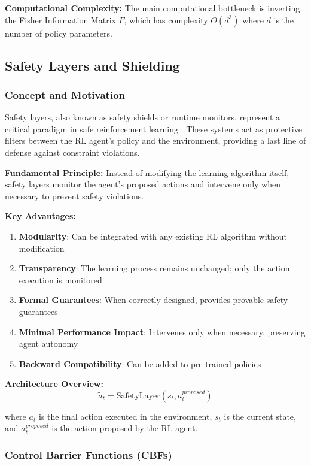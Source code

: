 \documentclass[12pt]{article}
\begin{document}
{{{{\textbf{Computational Complexity:} The main computational bottleneck is inverting the Fisher Information Matrix $F$, which has complexity $O(d^3)$ where $d$ is the number of policy parameters.

\subsection{Safety Layers and Shielding}

\subsubsection{Concept and Motivation}

Safety layers, also known as safety shields or runtime monitors, represent a critical paradigm in safe reinforcement learning \cite{Alshiekh2018}. These systems act as protective filters between the RL agent's policy and the environment, providing a last line of defense against constraint violations.

\textbf{Fundamental Principle:} Instead of modifying the learning algorithm itself, safety layers monitor the agent's proposed actions and intervene only when necessary to prevent safety violations.

\textbf{Key Advantages:}
\begin{enumerate}
\item \textbf{Modularity}: Can be integrated with any existing RL algorithm without modification
\item \textbf{Transparency}: The learning process remains unchanged; only the action execution is monitored
\item \textbf{Formal Guarantees}: When correctly designed, provides provable safety guarantees
\item \textbf{Minimal Performance Impact}: Intervenes only when necessary, preserving agent autonomy
\item \textbf{Backward Compatibility}: Can be added to pre-trained policies
\end{enumerate}

\textbf{Architecture Overview:}
\begin{equation}
\tilde{a}_t = \text{SafetyLayer}(s_t, a_t^{proposed})
\end{equation}

where $\tilde{a}_t$ is the final action executed in the environment, $s_t$ is the current state, and $a_t^{proposed}$ is the action proposed by the RL agent.

\subsubsection{Control Barrier Functions (CBFs)}

}}}}
\end{document}
